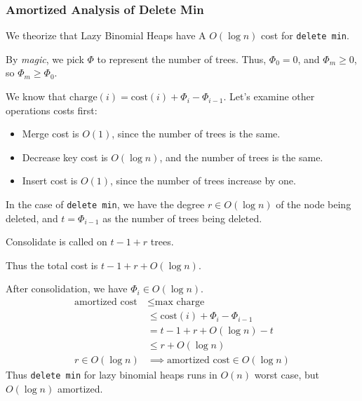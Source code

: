                     \subsubsection{Amortized Analysis of Delete Min} %
                    \label{ssub:amortized_analysis_of_delete_min}
                        We theorize that Lazy Binomial Heaps have A $O(\log n)$ cost for \verb|delete min|.

                        By \textit{magic}, we pick $\Phi$ to represent the number of trees.
                        Thus, $\Phi_0 = 0$, and $\Phi_m \ge 0$, so $\Phi_m \ge \Phi_0$.

                        We know that $\text{charge}(i) = \text{cost}(i) + \Phi_i - \Phi_{i-1}$.
                        Let's examine other operations costs first:
                        \begin{itemize}
                            \item Merge cost is $O(1)$, since the number of trees is the same.
                            \item Decrease key cost is $O(\log n)$, and the number of trees is the same.
                            \item Insert cost is $O(1)$, since the number of trees increase by one.
                        \end{itemize}
                        In the case of \verb|delete min|, we have the degree $r \in O(\log n)$ of the node being deleted, and $t = \Phi_{i-1}$ as the number of trees being deleted.

                        Consolidate is called on $t-1+r$ trees.

                        Thus the total cost is $t - 1 + r + O(\log n)$.

                        After consolidation, we have $\Phi_i \in O(\log n)$.
                        \begin{align*}
                            \text{amortized cost} &\le \text{max charge} \\
                            &\le \text{cost}(i) + \Phi_i - \Phi_{i-1} \\
                            &= t - 1 + r + O(\log n) - t \\
                            &\le r + O(\log n) \\
                            r \in O(\log n) &\implies \text{amortized cost} \in O(\log n)
                        \end{align*}
                        Thus \verb|delete min| for lazy binomial heaps runs in $O(n)$ worst case, but $O(\log n)$ amortized.
